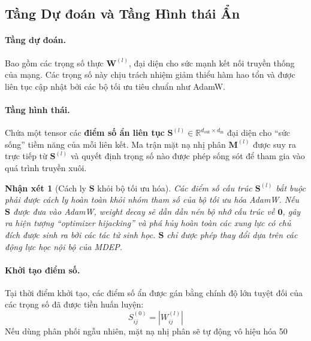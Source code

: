 \documentclass[11pt, a4paper]{article}
\newcommand{\R}{\mathbb{R}}
\newtheorem{remark}{Nhận xét}
\begin{document}
\subsection{Tầng Dự đoán và Tầng Hình thái Ẩn}\label{subsec:two_tiers}

\paragraph{Tầng dự đoán.}
Bao gồm các trọng số thực $\bm{W}^{(l)}$, đại diện cho sức mạnh kết nối truyền thống của mạng. Các trọng số này chịu trách nhiệm giảm thiểu hàm hao tổn và được liên tục cập nhật bởi các bộ tối ưu tiêu chuẩn như AdamW.

\paragraph{Tầng hình thái.}
Chứa một tensor các \textbf{điểm số ẩn liên tục} $\bm{S}^{(l)} \in \R^{d_{\text{out}} \times d_{\text{in}}}$ đại diện cho ``sức sống'' tiềm năng của mỗi liên kết. Ma trận mặt nạ nhị phân $\bm{M}^{(l)}$ được suy ra trực tiếp từ $\bm{S}^{(l)}$ và quyết định trọng số nào được phép sống sót để tham gia vào quá trình truyền xuôi.

\begin{remark}[Cách ly $\bm{S}$ khỏi bộ tối ưu hóa]
Các điểm số cấu trúc $\bm{S}^{(l)}$ bắt buộc phải được cách ly hoàn toàn khỏi nhóm tham số của bộ tối ưu hóa AdamW. Nếu $\bm{S}$ được đưa vào AdamW, weight decay sẽ dần dần nén bộ nhớ cấu trúc về $\bm{0}$, gây ra hiện tượng ``optimizer hijacking'' và phá hủy hoàn toàn các xung lực có chủ đích được sinh ra bởi các tác tử sinh học. $\bm{S}$ chỉ được phép thay đổi dựa trên các động lực học nội bộ của MDEP.
\end{remark}

\paragraph{Khởi tạo điểm số.}
Tại thời điểm khởi tạo, các điểm số ẩn được gán bằng chính độ lớn tuyệt đối của các trọng số đã được tiền huấn luyện:
\begin{equation}\label{eq:score_init}
    S_{ij}^{(0)} = |W_{ij}^{(l)}|
\end{equation}
Nếu dùng phân phối ngẫu nhiên, mặt nạ nhị phân sẽ tự động vô hiệu hóa 50%
\end{document}
